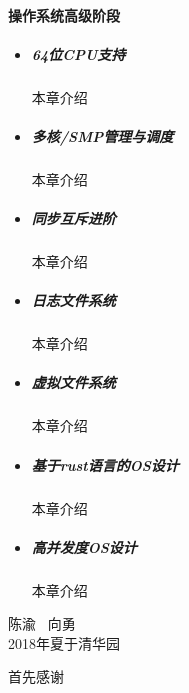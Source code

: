 \documentclass{zhbook}
\begin{document}
\begin{preface}
\paragraph{操作系统高级阶段}
\begin{itemize}
	\item
	\subparagraph{64位CPU支持}本章介绍		
	\item
	\subparagraph{多核/SMP管理与调度}本章介绍	
	\item
	\subparagraph{同步互斥进阶}本章介绍	
	\item
	\subparagraph{日志文件系统}本章介绍		
	\item
	\subparagraph{虚拟文件系统}本章介绍		
	\item
	\subparagraph{基于rust语言的OS设计}本章介绍	
	\item
	\subparagraph{高并发度OS设计}本章介绍		
\end{itemize}

\vspace{1cm}
\begin{flushright}
陈渝 \ 向勇\\
2018年夏于清华园
\end{flushright}

\end{preface}

\tableofcontents

\listoffigures

\listoftables

\mainmatter


%
%
%
%
%
%
%
%
%
%

\begin{acknowledgement}
  首先感谢
\end{acknowledgement}
\end{document}
